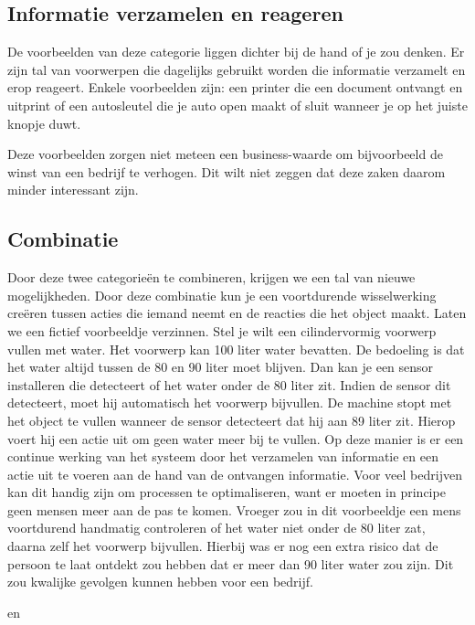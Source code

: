 \subsection{Informatie verzamelen en reageren}
De voorbeelden van deze categorie liggen dichter bij de hand of je zou denken. Er zijn tal van voorwerpen die dagelijks gebruikt worden die informatie verzamelt en erop reageert. Enkele voorbeelden zijn: een printer die een document ontvangt en uitprint of een autosleutel die je auto open maakt of sluit wanneer je op het juiste knopje duwt.

Deze voorbeelden zorgen niet meteen een business-waarde om bijvoorbeeld de winst van een bedrijf te verhogen. Dit wilt niet zeggen dat deze zaken daarom minder interessant zijn.

\subsection{Combinatie}
Door deze twee categorieën te combineren, krijgen we een tal van nieuwe mogelijkheden. Door deze combinatie kun je een voortdurende wisselwerking creëren tussen acties die iemand neemt en de reacties die het object maakt. Laten we een fictief voorbeeldje verzinnen. Stel je wilt een cilindervormig voorwerp vullen met water. Het voorwerp kan 100 liter water bevatten. De bedoeling is dat het water altijd tussen de 80 en 90 liter moet blijven. Dan kan je een sensor installeren die detecteert of het water onder de 80 liter zit. Indien de sensor dit detecteert, moet hij automatisch het voorwerp bijvullen. De machine stopt met het object te vullen wanneer de sensor detecteert dat hij aan 89 liter zit. Hierop voert hij een actie uit om geen water meer bij te vullen. Op deze manier is er een continue werking van het systeem door het verzamelen van informatie en een actie uit te voeren aan de hand van de ontvangen informatie. Voor veel bedrijven kan dit handig zijn om processen te optimaliseren, want er moeten in principe geen mensen meer aan de pas te komen. Vroeger zou in dit voorbeeldje een mens voortdurend handmatig controleren of het water niet onder de 80 liter zat, daarna zelf het voorwerp bijvullen. Hierbij was er nog een extra risico dat de persoon te laat ontdekt zou hebben dat er meer dan 90 liter water zou zijn. Dit zou kwalijke gevolgen kunnen hebben voor een bedrijf.

\autocite{McClelland2019} en \autocite{i-scoop2019}

